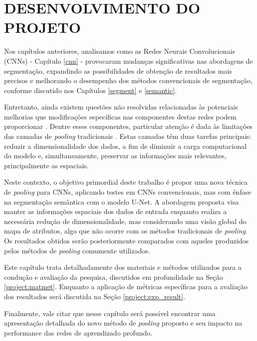 \newpage
\clearpage

\section{DESENVOLVIMENTO DO PROJETO}
\label{project}

Nos capítulos anteriores, analisamos como as Redes Neurais Convolucionais (CNNs) - Capítulo \ref{cnn} - provocaram mudanças significativas nas abordagens de segmentação, expandindo as possibilidades de obtenção de resultados mais precisos e melhorando o desempenho dos métodos convencionais de segmentação, conforme discutido nos Capítulos \ref{segment} e \ref{semantic}.

Entretanto, ainda existem questões não resolvidas relacionadas às potenciais melhorias que modificações específicas nas componentes destas redes podem proporcionar \citep{AsgariTaghanaki2021DeepReview}. Dentre esses componentes, particular atenção é dada às limitações das camadas de \textit{pooling} tradicionais \citep{Liu2019Multi-LevelNetworks, He2015SpatialRecognition}. Estas camadas têm duas tarefas principais: reduzir a dimensionalidade dos dados, a fim de diminuir a carga computacional do modelo e, simultaneamente, preservar as informações mais relevantes, principalmente as espaciais.

Neste contexto, o objetivo primordial deste trabalho é propor uma nova técnica de \textit{pooling} para CNNs, aplicando testes em CNNs convencionais, mas com ênfase na segmentação semântica com o modelo U-Net. A abordagem proposta visa manter as informações espaciais dos dados de entrada enquanto realiza a necessária redução de dimensionalidade, mas considerando uma visão global do mapa de atributos, algo que não ocorre com os métodos tradicionais de \textit{pooling}. Os resultados obtidos serão posteriormente comparados com aqueles produzidos pelos métodos de \textit{pooling} comumente utilizados.

Este capítulo trata detalhadamente dos materiais e métodos utilizados para a condução e avaliação da pesquisa, discutidos em profundidade na Seção \ref{project:matmet}. Enquanto a aplicação de métricas específicas para a avaliação dos resultados será discutida na Seção \ref{project:exp_result}.

Finalmente, vale citar que nesse capítulo será possível encontrar uma apresentação detalhada do novo método de \textit{pooling} proposto e seu impacto na performance das redes de aprendizado profundo.


